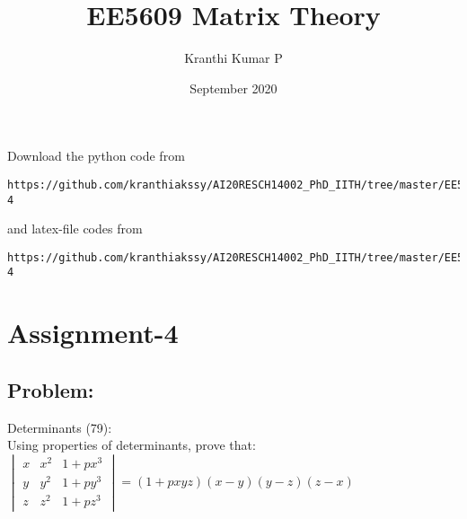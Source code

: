 \documentclass[journal,12pt,twocolumn]{IEEEtran}
\begin{document}
     \def\rightbox#1{\makebox[0in][r]{#1}}
     \def\centbox#1{\makebox[0in]{#1}}
     \def\topbox#1{\raisebox{-\baselineskip}[0in][0in]{#1}}
     \def\midbox#1{\raisebox{-0.5\baselineskip}[0in][0in]{#1}}
\vspace{3cm}
\title{EE5609 Matrix Theory}
\author{Kranthi Kumar P}
\date{September 2020}
\maketitle
\newpage
\bigskip
\renewcommand{\thefigure}{\theenumi}
\renewcommand{\thetable}{\theenumi}
Download the python code from 
\begin{lstlisting}
https://github.com/kranthiakssy/AI20RESCH14002_PhD_IITH/tree/master/EE5609_Matrix_Theory/Assignment-4
\end{lstlisting}
%
and latex-file codes from 
%
\begin{lstlisting}
https://github.com/kranthiakssy/AI20RESCH14002_PhD_IITH/tree/master/EE5609_Matrix_Theory/Assignment-4
\end{lstlisting}
\section*{Assignment-4}
\subsection*{Problem:}
Determinants (79):\\
Using properties of determinants, prove that:\\[6pt]
$\begin{vmatrix}
x&x^2&1+px^3\\y&y^2&1+py^3\\z&z^2&1+pz^3
\end{vmatrix}
= (1+pxyz)(x-y)(y-z)(z-x)$
\end{document}
